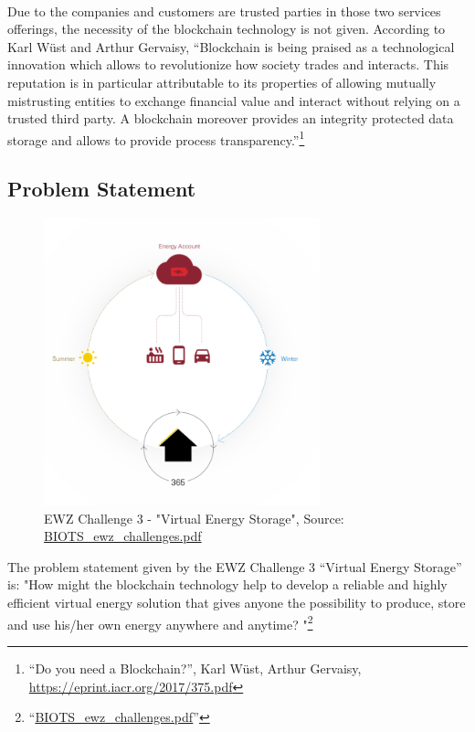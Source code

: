\documentclass{scrartcl}
\begin{document}
	\paragraph{}
	Due to the companies and customers are trusted parties in those two services offerings, the necessity of the blockchain technology is not given. According to Karl Wüst and Arthur Gervaisy, “Blockchain is being praised as a technological innovation which allows to revolutionize how society trades and interacts. This reputation is in particular attributable to its properties of allowing mutually mistrusting entities to exchange financial value and interact without relying on a trusted third party. A blockchain moreover provides an integrity protected data storage and allows to provide process transparency.”\footnote{“Do you need a Blockchain?”, Karl Wüst, Arthur Gervaisy, \url{https://eprint.iacr.org/2017/375.pdf}}
	
	\subsection{Problem Statement}
	
	\begin{figure} [h!]
		\centering
		\includegraphics[width=80mm,scale=0.5]{01_introduction_picture02.PNG}
		\caption{EWZ Challenge 3 - "Virtual Energy Storage", Source: \url{BIOTS_ewz_challenges.pdf}}
	\end{figure}
	
	The problem statement given by the EWZ Challenge 3 “Virtual Energy Storage” is: "How might the blockchain technology help to develop a reliable and highly efficient virtual energy solution that gives anyone the possibility to produce, store and use his/her own energy anywhere and anytime? "\footnote{“\url{BIOTS_ewz_challenges.pdf}”}
	
\end{document}
